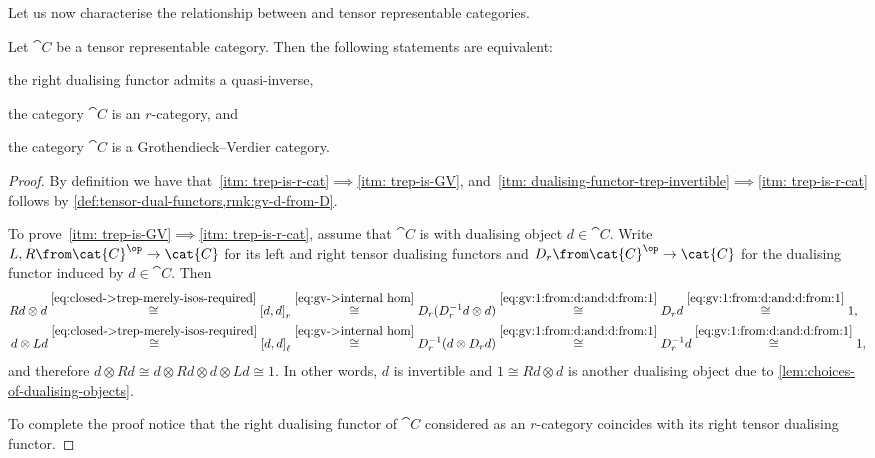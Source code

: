 Let us now characterise the relationship between \GV{} and tensor representable categories.

\begin{proposition}\label{prop:right-tensor-rep->right-gv}
  Let \(\cat{C}\) be a tensor representable category.
  Then the following statements are equivalent:
  \begin{thmlist}[noitemsep]
    \item\label{itm: dualising-functor-trep-invertible} the right dualising functor admits a quasi-inverse,
    \item\label{itm: trep-is-r-cat} the category \(\cat{C}\) is an \(r\)\hyp{}category, and
    \item\label{itm: trep-is-GV} the category \(\cat{C}\) is a Grothendieck–Verdier category.
  \end{thmlist}
\end{proposition}
\begin{proof}
  By definition we have that~\ref{itm: trep-is-r-cat}\(\implies\)\ref{itm: trep-is-GV},
  and~\ref{itm: dualising-functor-trep-invertible}\(\implies\)\ref{itm: trep-is-r-cat} follows by \cref{def:tensor-dual-functors,rmk:gv-d-from-D}.

  To prove~\ref{itm: trep-is-GV}\(\implies\)\ref{itm: trep-is-r-cat},
  assume that \(\cat{C}\) is \GV{} with dualising object \(d\in \cat{C}\).
  Write \(L, R \from \cat{C}^{\op} \to \cat{C}\) for its left and right tensor dualising functors and
  \(D_r\from \cat{C}^{\op} \to \cat{C}\) for the dualising functor induced by \(d\in \cat{C}\).
  Then
  \begin{align*}
    Rd \otimes d
    \overset{\eqref{eq:closed->trep-merely-isos-required}}{\cong} {[d,d]}_r
    & \overset{\eqref{eq:gv->internal hom}}{\cong} D_r(D_r^{-1} d \otimes d)
      \overset{\eqref{eq:gv:1:from:d:and:d:from:1}}{\cong} D_r d
      \overset{\eqref{eq:gv:1:from:d:and:d:from:1}}{\cong} 1,\\
    d \otimes Ld
    \overset{\eqref{eq:closed->trep-merely-isos-required}}{\cong} {[d,d]}_{\ell}
    & \overset{\eqref{eq:gv->internal hom}}{\cong} D_r^{-1}(d \otimes D_r d)
      \overset{\eqref{eq:gv:1:from:d:and:d:from:1}}{\cong} D_r^{-1} d
      \overset{\eqref{eq:gv:1:from:d:and:d:from:1}}{\cong} 1,
  \end{align*}
  and therefore \(d \otimes Rd \cong d \otimes Rd \otimes d \otimes Ld \cong 1\).
  In other words, \(d\) is invertible and \(1 \cong Rd\otimes d\) is another dualising object due to \cref{lem:choices-of-dualising-objects}.

  To complete the proof notice that the right dualising functor of \(\cat{C}\) considered as an \(r\)\hyp{}category
  coincides with its right tensor dualising functor.
\end{proof}

